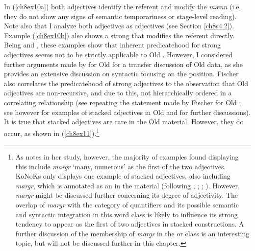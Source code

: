 \documentclass[output=paper,colorlinks,citecolor=brown]{langscibook}
\begin{document}
In (\ref{ch8ex10a}) both adjectives identify the referent and modify the  \emph{mænn} (i.e. they do not show any signs of semantic
temporariness or stage-level reading). Note also that I analyze both
adjectives as  adjectives (see Section \ref{ch8s4.2}). Example (\ref{ch8ex10b})
also shows a  strong  that modifies the referent
directly. Being  and , these examples show that inherent predicatehood for strong adjectives seems not
to be strictly applicable to Old . However, I considered further
arguments made by \citet{Fischer00, Fischer01} for Old  for a transfer discussion of
Old  data, as she provides an extensive discussion on syntactic
 focusing on the  position. Fischer also correlates
the predicatehood of strong adjectives to the observation that Old
 adjectives are non-recursive, and due to this, not hierarchically
ordered in a correlating relationship (see \citealp{vanGelderenLohndal2008}
repeating the statement made by Fischer for Old ; see however \citealp{Bech17} for examples of stacked adjectives in Old  and \citealp{Bech19} for further discussions). It is true that stacked adjectives are
rare in the Old  material. However, they do occur, as shown in
(\ref{ch8ex11}).\footnote{As \citet[15]{Bech17} notes in her study, however, the
  majority of examples found displaying this  include
  \emph{margr} `many, numerous' as the first of the two adjectives.
  KoNoKs only displays one example of stacked adjectives, also including
  \emph{margr}, which is annotated as an  in the 
  material (following \citealp[142]{Haugen2001}; \citealp[71]{Nedoma2010}; \citealp{Cleasby1957}; 
\citealp{Zoëga1910}). However, \textit{margr} might be discussed further
  concerning its degree of adjectivity. The overlap of \textit{margr} with the category of
  quantifiers and its possible semantic and syntactic integration in this
  word class is likely to influence its strong tendency to appear as the
  first of two adjectives in stacked  constructions. A further
  discussion of the membership of \emph{margr} in the  or
   class is an interesting topic, but will not be discussed further in this chapter.}
\end{document}
